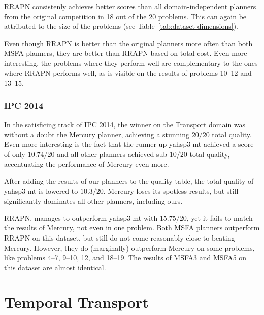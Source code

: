 RRAPN consistenly achieves better scores than all domain-independent planners from the original competition in 18 out of the 20 problems. This can again be attributed to the size
of the problems (see Table~\ref{tab:dataset-dimensions}).

Even though RRAPN is better than the original planners more often than both MSFA planners,
they are better than RRAPN based on total cost. Even more interesting, the problems
where they perform well are complementary to the ones where RRAPN performs well,
as is visible on the results of problems 10--12 and 13--15.


\subsubsection{IPC 2014}

In the satisficing track of IPC 2014, the winner on the Transport domain
was without a doubt the Mercury planner, achieving
a stunning $20/20$ total quality. Even more interesting is the fact that
the runner-up yahsp3-mt achieved a score of only $10.74/20$
and all other planners achieved sub $10/20$ total quality,
accentuating the performance of Mercury even more.

After adding the results of our planners to the quality table,
the total quality of yahsp3-mt is lowered to $10.3/20$.
Mercury loses its spotless results, but still significantly dominates all
other planners, including ours.

RRAPN, manages to outperform yahsp3-mt with $15.75/20$, yet it fails
to match the results of Mercury, not even in one problem.
Both MSFA planners outperform RRAPN on this dataset,
but still do not come reasonably close to beating Mercury.
However, they do (marginally) outperform Mercury on some problems, like
problems 4--7, 9--10, 12, and 18--19.
The results of MSFA3 and MSFA5 on this dataset are almost identical.

















\section{Temporal Transport}

